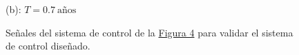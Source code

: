 \begin{figure}
\begin{minipage}{0.4\linewidth}
        \caption*{(b): $T= \SI{0.7}{\text{años}}$}
    \end{minipage}
    \caption{Señales del sistema de control de la \hyperref[fig4]{Figura 4} para validar el sistema de control diseñado.}
    \label{lmao}
\end{figure}
